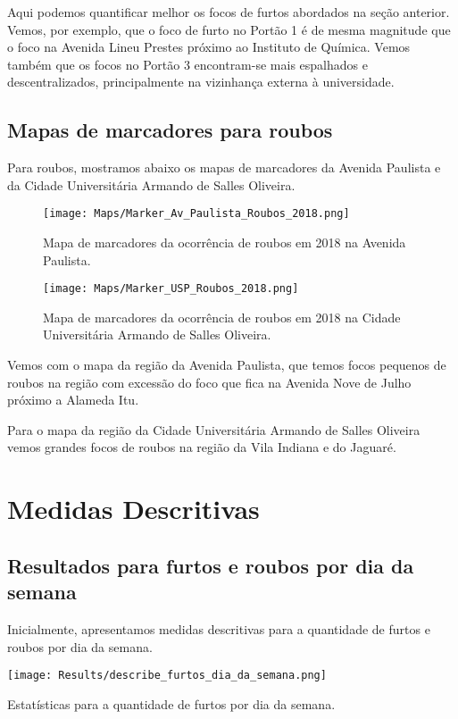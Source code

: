 \documentclass[
	12pt,
	openright,			%
	twoside,			%
	a4paper,			%
	chapter=TITLE,		%
	section=TITLE,		%
	subsection=TITLE,	%
	subsubsection=TITLE,%
	english,			%
	french,				%
	spanish,			%
	brazil				%
	]{abntex2}
\begin{document}
Aqui podemos quantificar melhor os focos de furtos abordados na seção anterior. Vemos, por exemplo, que o foco de furto no Portão 1 é de mesma magnitude que o foco na Avenida Lineu Prestes próximo ao Instituto de Química. Vemos também que os focos no Portão 3  encontram-se mais espalhados e descentralizados, principalmente na vizinhança externa à universidade.

\subsection{Mapas de marcadores para roubos}
Para roubos, mostramos abaixo os mapas de marcadores da Avenida Paulista e da Cidade Universitária Armando de Salles Oliveira.

\begin{figure}[!htbp]
\centering
\texttt{[image: Maps/Marker\_Av\_Paulista\_Roubos\_2018.png]}
\caption{Mapa de marcadores da ocorrência de roubos em 2018 na Avenida Paulista.}
\end{figure}
\newpage
\begin{figure}
\centering
\texttt{[image: Maps/Marker\_USP\_Roubos\_2018.png]}
\caption{Mapa de marcadores da ocorrência de roubos em 2018 na Cidade Universitária Armando de Salles Oliveira.}
\end{figure}

Vemos com o mapa da região da Avenida Paulista, que temos focos pequenos de roubos na região com excessão do foco que fica na Avenida Nove de Julho próximo a Alameda Itu.

Para o mapa da região da Cidade Universitária Armando de Salles Oliveira vemos grandes focos de roubos na região da Vila Indiana e do Jaguaré.

\section{Medidas Descritivas}
\subsection{Resultados para furtos e roubos por dia da semana}
Inicialmente, apresentamos medidas descritivas para a quantidade de furtos e roubos por dia da semana.

\begin{table}[H]
\centering
\centerline{\texttt{[image: Results/describe\_furtos\_dia\_da\_semana.png]}}
\caption{Estatísticas para a quantidade de furtos por dia da semana.}
\end{table}
\end{document}
